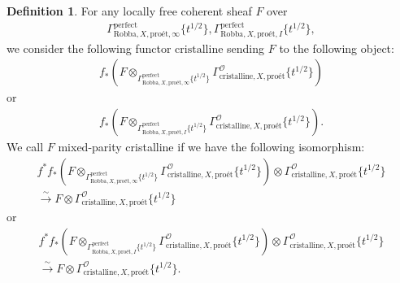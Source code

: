 \documentclass[12pt]{book}
\theoremstyle{definition}
\newtheorem{definition}{Definition}
\begin{document}
\begin{definition}
For any locally free coherent sheaf $F$ over
\begin{align}
\Gamma^\mathrm{perfect}_{\text{Robba},X,\text{pro\'et},\infty}\{t^{1/2}\},\Gamma^\mathrm{perfect}_{\text{Robba},X,\text{pro\'et},I}\{t^{1/2}\},
\end{align} 
we consider the following functor $\mathrm{cristalline}$ sending $F$ to the following object:
\begin{align}
f_*(F\otimes_{\Gamma^\mathrm{perfect}_{\text{Robba},X,\text{pro\'et},\infty}\{t^{1/2}\}} \Gamma^\mathcal{O}_{\text{cristalline},X,\text{pro\'et}}\{t^{1/2}\})
\end{align}
or 
\begin{align}
f_*(F\otimes_{\Gamma^\mathrm{perfect}_{\text{Robba},X,\text{pro\'et},I}\{t^{1/2}\}} \Gamma^\mathcal{O}_{\text{cristalline},X,\text{pro\'et}}\{t^{1/2}\}).
\end{align}
We call $F$ mixed-parity cristalline if we have the following isomorphism:
\begin{align}
f^*f_*(F\otimes_{\Gamma^\mathrm{perfect}_{\text{Robba},X,\text{pro\'et},\infty}\{t^{1/2}\}} \Gamma^\mathcal{O}_{\text{cristalline},X,\text{pro\'et}}\{t^{1/2}\}) \otimes \Gamma^\mathcal{O}_{\text{cristalline},X,\text{pro\'et}}\{t^{1/2}\}\\
 \overset{\sim}{\longrightarrow} F \otimes \Gamma^\mathcal{O}_{\text{cristalline},X,\text{pro\'et}}\{t^{1/2}\} 
\end{align}
or 
\begin{align}
f^*f_*(F\otimes_{\Gamma^\mathrm{perfect}_{\text{Robba},X,\text{pro\'et},I}\{t^{1/2}\}} \Gamma^\mathcal{O}_{\text{cristalline},X,\text{pro\'et}}\{t^{1/2}\}) \otimes \Gamma^\mathcal{O}_{\text{cristalline},X,\text{pro\'et}}\{t^{1/2}\}\\ \overset{\sim}{\longrightarrow} F \otimes \Gamma^\mathcal{O}_{\text{cristalline},X,\text{pro\'et}}\{t^{1/2}\}. 
\end{align}
\end{definition}
\end{document}
